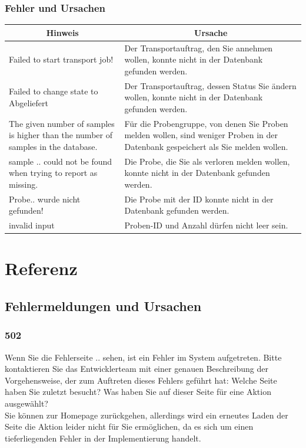 \documentclass[enabledeprecatedfontcommands,fontsize=12pt,paper=a4,twoside]{scrartcl}
\begin{document}
\subsubsection{Fehler und Ursachen}
\begin{longtable}[c]{|p{5cm}|p{10cm}|}
\hline
\multicolumn{1}{|c|}{\textbf{Hinweis}}                          & \multicolumn{1}{c|}{\textbf{Ursache}}                                                                                                                                                                                                               \\ \hline
\endhead
Failed to start transport job! & Der Transportauftrag, den Sie annehmen wollen, konnte nicht in der Datenbank gefunden werden. \\ \hline
Failed to change state to Abgeliefert & Der Transportauftrag, dessen Status Sie ändern wollen, konnte nicht in der Datenbank gefunden werden.\\ \hline
The given number of samples is higher than the number of samples in the database. &  Für die Probengruppe, von denen Sie Proben melden wollen, sind weniger Proben in der Datenbank gespeichert als Sie melden wollen. \\ \hline
sample .. could not be found when trying to report as missing. & Die Probe, die Sie als verloren melden wollen, konnte nicht in der Datenbank gefunden werden. \\ \hline
Probe.. wurde nicht gefunden! & Die Probe mit der ID konnte nicht in der Datenbank gefunden werden. \\ \hline
invalid input& Proben-ID und Anzahl dürfen nicht leer sein. \\ \hline
\end{longtable}

\clearpage
\section{Referenz}
\subsection{Fehlermeldungen und Ursachen}
\subsubsection{502}
Wenn Sie die Fehlerseite .. sehen, ist ein Fehler im System aufgetreten. Bitte kontaktieren Sie das Entwicklerteam mit einer genauen Beschreibung der Vorgehensweise, der zum Auftreten dieses Fehlers geführt hat: Welche Seite haben Sie zuletzt besucht? Was haben Sie auf dieser Seite für eine Aktion ausgewählt? \\
Sie können zur Homepage zurückgehen, allerdings wird ein erneutes Laden der Seite die Aktion leider nicht für Sie ermöglichen, da es sich um einen tieferliegenden Fehler in der Implementierung handelt. \\
\end{document}
